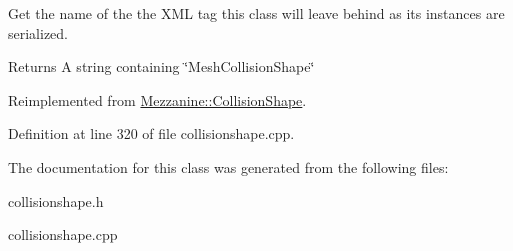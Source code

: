 Get the name of the the XML tag this class will leave behind as its instances are serialized. 

\begin{DoxyReturn}{Returns}
A string containing \char`\"{}MeshCollisionShape\char`\"{} 
\end{DoxyReturn}


Reimplemented from \hyperlink{classMezzanine_1_1CollisionShape_ae5a97a76b687d450f17d0ac86b227f1d}{Mezzanine::CollisionShape}.



Definition at line 320 of file collisionshape.cpp.



The documentation for this class was generated from the following files:\begin{DoxyCompactItemize}
\item 
collisionshape.h\item 
collisionshape.cpp\end{DoxyCompactItemize}
